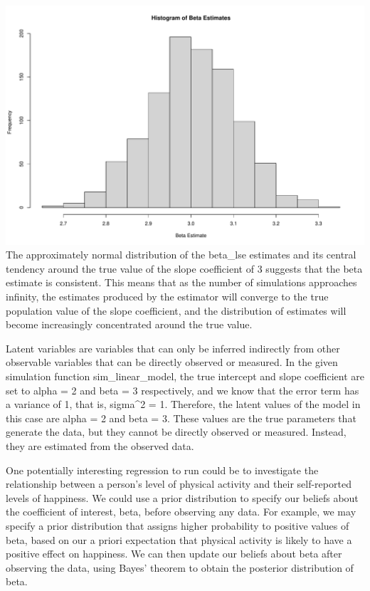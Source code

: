 \documentclass{article}
\begin{document}
\includegraphics{RMarkdown_files/figure-latex/global_options4-2.pdf} The
approximately normal distribution of the beta\_lse estimates and its
central tendency around the true value of the slope coefficient of 3
suggests that the beta estimate is consistent. This means that as the
number of simulations approaches infinity, the estimates produced by the
estimator will converge to the true population value of the slope
coefficient, and the distribution of estimates will become increasingly
concentrated around the true value.

Latent variables are variables that can only be inferred indirectly from
other observable variables that can be directly observed or measured. In
the given simulation function sim\_linear\_model, the true intercept and
slope coefficient are set to alpha = 2 and beta = 3 respectively, and we
know that the error term has a variance of 1, that is, sigma\^{}2 = 1.
Therefore, the latent values of the model in this case are alpha = 2 and
beta = 3. These values are the true parameters that generate the data,
but they cannot be directly observed or measured. Instead, they are
estimated from the observed data.

One potentially interesting regression to run could be to investigate
the relationship between a person's level of physical activity and their
self-reported levels of happiness. We could use a prior distribution to
specify our beliefs about the coefficient of interest, beta, before
observing any data. For example, we may specify a prior distribution
that assigns higher probability to positive values of beta, based on our
a priori expectation that physical activity is likely to have a positive
effect on happiness. We can then update our beliefs about beta after
observing the data, using Bayes' theorem to obtain the posterior
distribution of beta.
\end{document}
